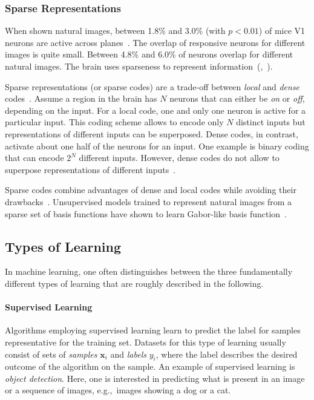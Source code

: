 \subsubsection{Sparse Representations}\label{subsubsec:sparse_representations}

When shown natural images, between 1.8\% and 3.0\% (with $p < 0.01$) of mice \ac{V1} neurons are active across planes~\citep{yoshida2020natural}.
The overlap of responsive neurons for different images is quite small.
Between 4.8\% and 6.0\% of neurons overlap for different natural images.
The brain uses sparseness to represent information~(\citep{yoshida2020natural},~\citep[pp. 356, ff.]{trappenberg2010fundamentals}).

Sparse representations (or sparse codes) are a trade-off between \textit{local} and \textit{dense} codes~\citep{foldiak2003sparse}.
Assume a region in the brain has $N$ neurons that can either be \textit{on} or \textit{off}, depending on the input.
For a local code, one and only one neuron is active for a particular input.
This coding scheme allows to encode only $N$ distinct inputs but representations of different inputs can be superposed.
Dense codes, in contrast, activate about one half of the neurons for an input.
One example is binary coding that can encode $2^N$ different inputs.
However, dense codes do not allow to superpose representations of different inputs~\citep{foldiak2003sparse}.

Sparse codes combine advantages of dense and local codes while avoiding their drawbacks~\citep{foldiak2003sparse}.
Unsupervised models trained to represent natural images from a sparse set of basis functions have shown to learn Gabor-like basis function~\citep{Olshausen1996}.

\subsection{Types of Learning}\label{subsec:types-of-learning}

In machine learning, one often distinguishes between the three fundamentally different types of learning that are roughly described in the following.

\paragraph{Supervised Learning}
Algorithms employing supervised learning learn to predict the label for samples representative for the training set.
Datasets for this type of learning usually consist of sets of \textit{samples} $\bm{x}_i$ and \textit{labels} $y_i$, where the label describes the desired outcome of the algorithm on the sample.
An example of supervised learning is \textit{object detection}.
Here, one is interested in predicting what is present in an image or a sequence of images, e.g.,~images showing a dog or a cat.

